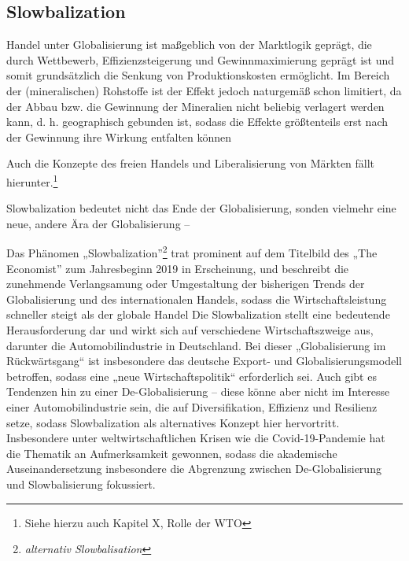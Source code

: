 \documentclass[12pt,a4paper,oneside]{book} %
\begin{document}
{	\subsection{Slowbalization}
	Handel unter Globalisierung ist maßgeblich von der Marktlogik geprägt, die durch Wettbewerb, Effizienzsteigerung und Gewinnmaximierung geprägt ist und somit grundsätzlich die Senkung von Produktionskosten ermöglicht. Im Bereich der (mineralischen) Rohstoffe ist der Effekt jedoch naturgemäß schon limitiert, da der Abbau bzw. die Gewinnung der Mineralien nicht beliebig verlagert werden kann, d. h. geographisch gebunden ist, sodass die Effekte größtenteils erst nach der Gewinnung ihre Wirkung entfalten können 
	
	Auch die Konzepte des freien Handels und Liberalisierung von Märkten fällt hierunter.\footnote{Siehe hierzu auch Kapitel X, Rolle der WTO}
	
	Slowbalization bedeutet nicht das Ende der Globalisierung, sonden vielmehr eine neue, andere Ära der Globalisierung -- 
	
	Das Phänomen „Slowbalization”\footnote{\textit{alternativ Slowbalisation}} trat prominent auf dem Titelbild des „The Economist” zum Jahresbeginn 2019\autocite{economist_slowbalisation_2019} in Erscheinung, und beschreibt die zunehmende Verlangsamung oder Umgestaltung der bisherigen Trends der Globalisierung und des internationalen Handels, sodass die Wirtschaftsleistung schneller steigt als der globale Handel%
	Die Slowbalization stellt eine bedeutende Herausforderung dar und wirkt sich auf verschiedene Wirtschaftszweige aus, darunter die Automobilindustrie in Deutschland. Bei dieser „Globalisierung im Rückwärtsgang“ ist insbesondere das deutsche Export- und Globalisierungsmodell betroffen, sodass eine „neue Wirtschaftspolitik“ erforderlich sei.\autocite{maier_globalisierung_2019} Auch gibt es Tendenzen hin zu einer De-Globalisierung – diese könne aber nicht im Interesse einer Automobilindustrie sein, die auf Diversifikation, Effizienz und Resilienz setze,\autocite{rade_globalisierung_2022} sodass Slowbalization als alternatives Konzept hier hervortritt. Insbesondere unter weltwirtschaftlichen Krisen wie die Covid-19-Pandemie hat die Thematik an Aufmerksamkeit gewonnen, sodass die akademische Auseinandersetzung insbesondere die Abgrenzung zwischen De-Globalisierung und Slowbalisierung fokussiert.\autocites{dalla_longa_urban_2023}{inferrera_globalisation_2021}
	
}
\end{document}
